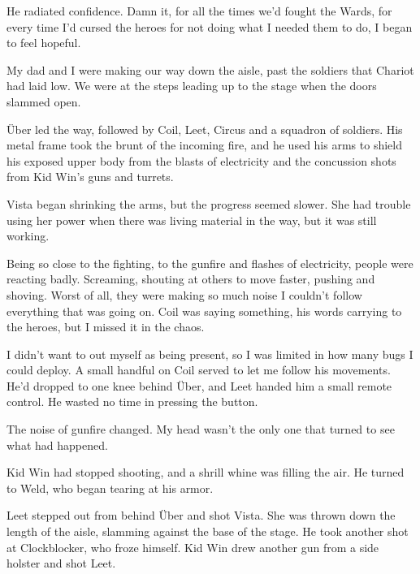 He radiated confidence.  Damn it, for all the times we'd fought the Wards, for every time I'd cursed the heroes for not doing what I needed them to do, I began to feel hopeful.



My dad and I were making our way down the aisle, past the soldiers that Chariot had laid low.  We were at the steps leading up to the stage when the doors slammed open.



\"{U}ber led the way, followed by Coil, Leet, Circus and a squadron of soldiers.  His metal frame took the brunt of the incoming fire, and he used his arms to shield his exposed upper body from the blasts of electricity and the concussion shots from Kid Win's guns and turrets.



Vista began shrinking the arms, but the progress seemed slower.  She had trouble using her power when there was living material in the way, but it was still working.



Being so close to the fighting, to the gunfire and flashes of electricity, people were reacting badly.  Screaming, shouting at others to move faster, pushing and shoving.  Worst of all, they were making so much noise I couldn't follow everything that was going on.  Coil was saying something, his words carrying to the heroes, but I missed it in the chaos.



I didn't want to out myself as being present, so I was limited in how many bugs I could deploy.  A small handful on Coil served to let me follow his movements.  He'd dropped to one knee behind \"{U}ber, and Leet handed him a small remote control.  He wasted no time in pressing the button.



The noise of gunfire changed.  My head wasn't the only one that turned to see what had happened.



Kid Win had stopped shooting, and a shrill whine was filling the air.  He turned to Weld, who began tearing at his armor.



Leet stepped out from behind \"{U}ber and shot Vista.  She was thrown down the length of the aisle, slamming against the base of the stage.  He took another shot at Clockblocker, who froze himself.  Kid Win drew another gun from a side holster and shot Leet.



